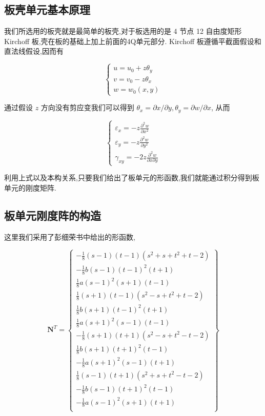 
\subsection{板壳单元基本原理}
我们所选用的板壳就是最简单的板壳,对于板选用的是 4 节点 12 自由度矩形 Kirchoff 板,壳在板的基础上加上前面的4Q单元部分. Kirchoff 板遵循平截面假设和直法线假设,因而有

\[
\left\{ \begin{gathered}
u=u_0+z\theta_y \\
v=v_0-z\theta_x \\
w=w_0(x,y)
\end{gathered} \right.
\]

通过假设 $z$ 方向没有剪应变我们可以得到 $\theta_x=\partial x/\partial y, \theta_y=\partial w/\partial x$, 从而

\[
\left\{ \begin{gathered}
\varepsilon_x = -z\frac{\partial^2 w}{\partial x^2} \\
\varepsilon_y = -z\frac{\partial^2 w}{\partial y^2} \\
\gamma_{xy} = -2z\frac{\partial^2 w}{\partial x \partial y}
\end{gathered} \right.
\]

利用上式以及本构关系,只要我们给出了板单元的形函数,我们就能通过积分得到板单元的刚度矩阵.

\subsection{板单元刚度阵的构造}

这里我们采用了彭细荣书中给出的形函数,

\[ \mathbf{N}^T=\left\{
\begin{array}{c}
-\frac{1}{8}(s-1)(t-1)(s^2+s+t^2+t-2)\\ -\frac{1}{8}b(s-1)(t-1)^2(t+1)\\ \frac{1}{8}a(s-1)^2(s+1)(t-1) \\
\frac{1}{8}(s+1)(t-1)(s^2-s+t^2+t-2) \\ \frac{1}{8}b(s+1)(t-1)^2(t+1) \\ \frac{1}{8}a(s+1)^2(s-1)(t-1) \\
-\frac{1}{8}(s+1)(t+1)(s^2-s+t^2-t-2)\\ \frac{1}{8}b(s+1)(t+1)^2(t-1) \\ -\frac{1}{8}a(s+1)^2(s-1)(t+1) \\
\frac{1}{8}(s-1)(t+1)(s^2+s+t^2-t-2) \\ -\frac{1}{8}b(s-1)(t+1)^2(t-1) \\ -\frac{1}{8}a(s-1)^2(s+1)(t+1) \\
\end{array} \right\} \]


